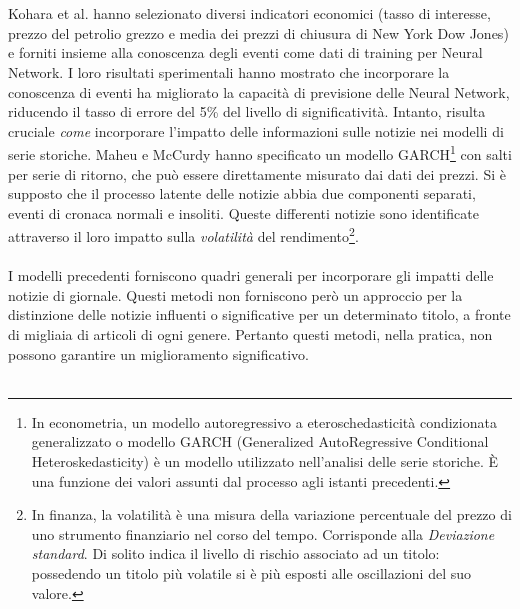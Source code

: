 \documentclass[a4paper,12pt]{report}
\begin{document}
\\~\\Kohara et al. \cite{know-nn2} hanno selezionato diversi indicatori economici (tasso di interesse, prezzo del petrolio grezzo e media dei prezzi di chiusura di New York Dow Jones) e forniti insieme alla conoscenza degli eventi come dati di training per Neural Network. I loro risultati sperimentali hanno mostrato che incorporare la conoscenza di eventi ha migliorato la capacità di previsione delle Neural Network, riducendo il tasso di errore del 5\% del livello di significatività. Intanto, risulta cruciale \textit{come} incorporare l'impatto delle informazioni sulle notizie nei modelli di serie storiche. Maheu e McCurdy \cite{26} hanno specificato un modello GARCH\footnote{In econometria, un modello autoregressivo a eteroschedasticità condizionata generalizzato o modello GARCH (Generalized AutoRegressive Conditional Heteroskedasticity) è un modello utilizzato nell'analisi delle serie storiche. È una funzione dei valori assunti dal processo agli istanti precedenti.} con salti per serie di ritorno, che può essere direttamente misurato dai dati dei prezzi. Si è supposto che il processo latente delle notizie abbia due componenti separati, eventi di cronaca normali e insoliti. Queste differenti notizie sono identificate attraverso il loro impatto sulla \textit{volatilità} del rendimento\footnote{In finanza, la volatilità è una misura della variazione percentuale del prezzo di uno strumento finanziario nel corso del tempo. Corrisponde alla \textit{Deviazione standard}. Di solito indica il livello di rischio associato ad un titolo: possedendo un titolo più volatile si è più esposti alle oscillazioni del suo valore.}.\\~\\ I modelli precedenti forniscono quadri generali per incorporare gli impatti delle notizie di giornale. Questi metodi non forniscono però un approccio per la distinzione delle notizie influenti o significative per un determinato titolo, a fronte di migliaia di articoli di ogni genere. Pertanto questi metodi, nella pratica, non possono garantire un miglioramento significativo. \\~\\
\end{document}
